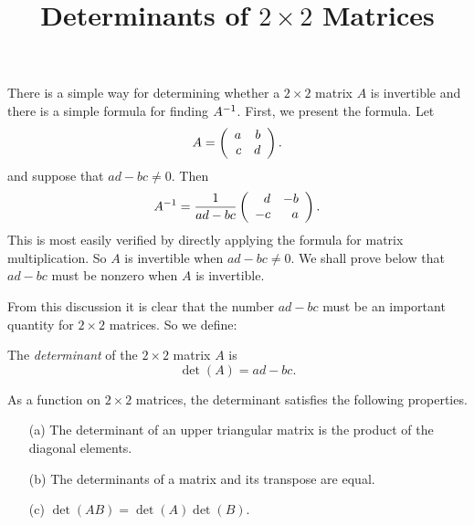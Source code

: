\documentclass{ximera}
\title{Determinants of $2\times 2$ Matrices}
\begin{document}
\begin{abstract}
\end{abstract}
\maketitle


\label{S:det2x2}

There is a simple way for determining whether a $2\times 2$ matrix $A$ is
invertible and there is a simple formula for finding $A^{-1}$.
  First, we present the formula.  Let
\[
A=\left(\begin{array}{rr} a & b\\ c &d\end{array}\right).
\]
and suppose that $ad-bc\neq0$.  Then
\begin{equation}  \label{e:formAinv}
A^{-1} = \frac{1}{ad-bc} \left(\begin{array}{rr} d & -b\\ -c &a\end{array}\right).
\end{equation}
This is most easily verified by directly applying the formula for
matrix multiplication.  So $A$ is invertible when $ad-bc\neq 0$. We
shall prove below that $ad-bc$ must be nonzero when $A$ is invertible.

From this discussion it is clear that the number $ad-bc$ must be an
important quantity for $2\times 2$ matrices.  So we define:
\begin{definition}
The {\em determinant\/}  of the $2\times 2$
matrix $A$ is
\begin{equation}  \label{D:determinant}
\det(A) = ad - bc.
\end{equation}
\end{definition}

\begin{proposition} \label{propdet}
As a function on $2\times 2$ matrices, the determinant satisfies
the following properties.
\begin{itemize}
\item[(a)] The determinant of an upper triangular matrix is the
product of the diagonal elements. 
\item[(b)] The determinants of a matrix and its transpose are
equal. 
\item[(c)] $\det(AB) = \det(A)\det(B)$.
\end{itemize}
\end{proposition}
\end{document}
